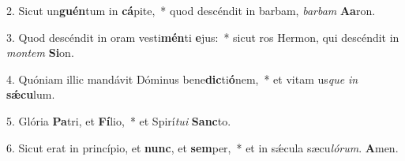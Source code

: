 2. Sicut un\textbf{guén}tum in \textbf{cá}pite,~*  quod descéndit in barbam, \textit{bar}\textit{bam} \textbf{A}\textbf{a}ron.\

3. Quod descéndit in oram vesti\textbf{mén}ti \textbf{e}jus:~*  sicut ros Hermon, qui descéndit in \textit{mon}\textit{tem} \textbf{Si}on.\

4. Quóniam illic mandávit Dóminus bene\textbf{dic}ti\textbf{ó}nem,~*  et vitam us\textit{que} \textit{in} \textbf{sǽ}\textbf{cu}lum.\

5. Glória \textbf{Pa}tri, et \textbf{Fí}lio,~*  et Spirí\textit{tu}\textit{i} \textbf{Sanc}to.\

6. Sicut erat in princípio, et \textbf{nunc}, et \textbf{sem}per,~*  et in sǽcula sæcu\textit{ló}\textit{rum}. \textbf{A}men.\

